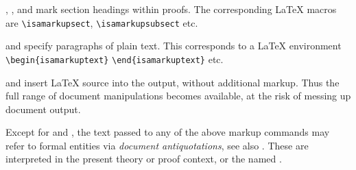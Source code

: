 \begin{isabellebody}
\begin{isamarkuptext}
\begin{description}
  \item \hyperlink{command.sect}{\mbox{}}, \hyperlink{command.subsect}{\mbox{}}, and \hyperlink{command.subsubsect}{\mbox{}}
  mark section headings within proofs.  The corresponding {\LaTeX}
  macros are \verb|\isamarkupsect|, \verb|\isamarkupsubsect| etc.

  \item \hyperlink{command.text}{\mbox{}} and \hyperlink{command.txt}{\mbox{}} specify paragraphs of plain
  text.  This corresponds to a {\LaTeX} environment \verb|\begin{isamarkuptext}|  \verb|\end{isamarkuptext}| etc.

  \item \hyperlink{command.text-raw}{\mbox{}} and \hyperlink{command.txt-raw}{\mbox{}} insert {\LaTeX}
  source into the output, without additional markup.  Thus the full
  range of document manipulations becomes available, at the risk of
  messing up document output.

  \end{description}

  Except for \hyperlink{command.text-raw}{\mbox{}} and \hyperlink{command.txt-raw}{\mbox{}}, the text
  passed to any of the above markup commands may refer to formal
  entities via \emph{document antiquotations}, see also
  .  These are interpreted in the present theory or
  proof context, or the named .


\end{isamarkuptext}
\end{isabellebody}
